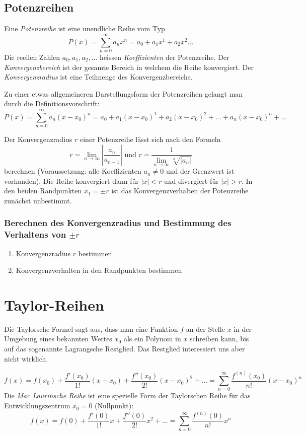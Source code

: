 \subsection{Potenzreihen}
\begin{definition}Eine \textit{Potenzreihe} ist eine unendliche Reihe vom Typ $$P(x)= \sum\limits_{n=0}^{\infty} a_n x^n = a_0 + a_1x^1 + a_2 x^2 ...$$
Die reellen Zahlen $a_0, a_1, a_2, ...$ heissen \textit{Koeffizienten} der Potenzreihe. Der \textit{Konvergenzbereich} ist der gesamte Bereich in welchem die Reihe konvergiert. Der \textit{Konvergenzradius} ist eine Teilmenge des Konvergenzbereichs.
\end{definition}
Zu einer etwas allgemeineren Darstellungsform der Potenzreihen gelangt man durch die Definitionsvorschrift:
$$P(x) = \sum\limits_{n=0}^{\infty} a_n (x-x_0)^n = a_0 + a_1(x-x_0)^1 + a_2(x-x_0)^2 + ... + a_n(x-x_0)^n + ...$$
\begin{formel}
Der Konvergenzradius $r$ einer Potenzreihe lässt sich nach den Formeln 
$$r = \lim\limits_{n \rightarrow \infty} \left|\frac{a_n}{a_{n+1}}\right| \text{ und } r = \frac{1}{\lim\limits_{n \rightarrow \infty} \sqrt[n]{\left|a_n\right|}}$$
berechnen (Voraussetzung: alle Koeffizienten $a_n \neq 0$ und der Grenzwert ist vorhanden). Die Reihe konvergiert dann für $|x| < r$ und divergiert für $|x|>r$. In den beiden Randpunkten $x_1 = \pm r$ ist das Konvergenzverhalten der Potenzreihe zunächst unbestimmt.
\end{formel}

\subsubsection*{Berechnen des Konvergenzradius und Bestimmung des Verhaltens von $\pm r$}
\begin{enumerate}
	\item Konvergenzradius $r$ bestimmen
	\item Konvergenzverhalten in den Randpunkten bestimmen
\end{enumerate}

\section{Taylor-Reihen}
Die Taylorsche Formel sagt aus, dass man eine Funktion $f$ an der Stelle $x$ in der Umgebung eines bekannten Wertes $x_0$ als ein Polynom in $x$ schreiben kann, bis auf das sogenannte Lagrangsche Restglied. Das Restglied interessiert uns aber nicht wirklich.
\begin{formel}
$$f(x) = f(x_0) + \frac{f'(x_0)}{1!}(x-x_0) + \frac{f''(x_0)}{2!}(x-x_0)^2 + ... = \sum\limits_{n=0}^{\infty} \frac{f^{(n)}(x_0)}{n!}(x - x_0)^n$$
Die \textit{Mac Laurinsche Reihe} ist eine spezielle Form der Taylorschen Reihe für das Entwicklungszentrum $x_0 = 0$ (Nullpunkt):
$$f(x) = f(0) + \frac{f'(0)}{1!}x + \frac{f''(0)}{2!}x^2 + ... = \sum\limits_{n=0}^{\infty} \frac{f^{(n)}(0)}{n!}x^n$$
\end{formel}

